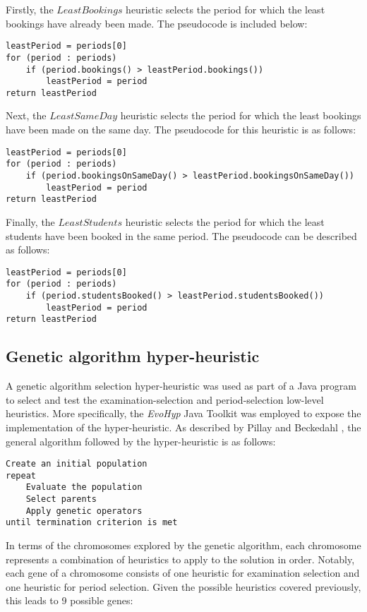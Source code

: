 \documentclass[conference]{IEEEtran}
\begin{document}
Firstly, the \(LeastBookings\) heuristic selects the period for which the least bookings have already been made. The pseudocode is included below:
\begin{lstlisting}
leastPeriod = periods[0]
for (period : periods)
	if (period.bookings() > leastPeriod.bookings())
		leastPeriod = period
return leastPeriod
\end{lstlisting}
Next, the \(LeastSameDay\) heuristic selects the period for which the least bookings have been made on the same day. The pseudocode for this heuristic is as follows:
\begin{lstlisting}
leastPeriod = periods[0]
for (period : periods)
	if (period.bookingsOnSameDay() > leastPeriod.bookingsOnSameDay())
		leastPeriod = period
return leastPeriod
\end{lstlisting}
Finally, the \(LeastStudents\) heuristic selects the period for which the least students have been booked in the same period. The pseudocode can be described as follows:
\begin{lstlisting}
leastPeriod = periods[0]
for (period : periods)
	if (period.studentsBooked() > leastPeriod.studentsBooked())
		leastPeriod = period
return leastPeriod
\end{lstlisting}

\subsection{Genetic algorithm hyper-heuristic}
A genetic algorithm selection hyper-heuristic was used as part of a Java program to select and test the examination-selection and period-selection low-level heuristics. More specifically, the \emph{EvoHyp} \cite{pillay2017evohyp} Java Toolkit was employed to expose the implementation of the hyper-heuristic. As described by Pillay and Beckedahl \cite{pillay2017evohyp}, the general algorithm followed by the hyper-heuristic is as follows:
\begin{lstlisting}
Create an initial population
repeat
    Evaluate the population
    Select parents
    Apply genetic operators
until termination criterion is met
\end{lstlisting}

In terms of the chromosomes explored by the genetic algorithm, each chromosome represents a combination of heuristics to apply to the solution in order. Notably, each gene of a chromosome consists of one heuristic for examination selection and one heuristic for period selection. Given the possible heuristics covered previously, this leads to 9 possible genes:
\end{document}
